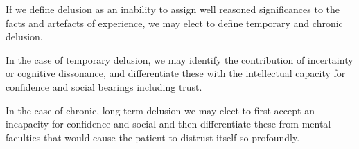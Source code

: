

If we define delusion as an inability to assign well reasoned
significances to the facts and artefacts of experience, we may elect
to define temporary and chronic delusion.  

In the case of temporary delusion, we may identify the contribution of
incertainty or cognitive dissonance, and differentiate these with the
intellectual capacity for confidence and social bearings including
trust.

In the case of chronic, long term delusion we may elect to first
accept an incapacity for confidence and social and then differentiate
these from mental faculties that would cause the patient to distrust
itself so profoundly.

\bye
